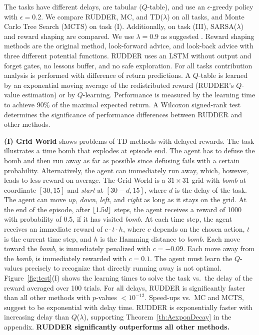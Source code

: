 \documentclass{article}
\DeclarePairedDelimiter\floor{\lfloor}{\rfloor}
\begin{document}
The tasks have different delays, 
are tabular ($Q$-table),
and use an $\epsilon$-greedy policy with $\epsilon = 0.2$.
We compare RUDDER, MC, and TD($\lambda$) 
on all tasks, and Monte Carlo Tree Search (MCTS) on task (I).
Additionally, on task (III), SARSA($\lambda$) and reward shaping are compared.
We use $\lambda=0.9$ as suggested \cite{Sutton:18book}.
Reward shaping methods are the original method, look-forward advice,
and look-back advice with three different potential functions.
RUDDER uses an LSTM without output and forget gates,
no lessons buffer, and no safe exploration. 
For all tasks contribution analysis is performed 
with difference of return predictions.  
A $Q$-table is learned 
by an exponential moving average of 
the redistributed reward (RUDDER's $Q$-value estimation) 
or by $Q$-learning. 
Performance is measured by 
the learning time to achieve 90\% of the maximal expected return.
A Wilcoxon signed-rank test determines 
the significance of performance differences between RUDDER
and other methods.



{\bf(I) Grid World} 
shows problems of TD methods with delayed rewards.
The task illustrates a time bomb that
explodes at episode end.
The agent has to defuse the bomb
and then run away as far as possible since
defusing fails with a certain probability.
Alternatively, the agent can immediately run away, 
which, however, leads to less reward on average.
The Grid World is a $31\times 31$ grid with
{\em bomb} at coordinate $[30,15]$ and
{\em start} at $[30-d, 15]$, where $d$ is the delay of the task.
The agent can move 
{\em up}, {\em down}, {\em left}, and {\em right} as long as
it stays on the grid.
At the end of the episode, after $\floor*{1.5 d}$ steps, 
the agent receives a reward of 1000
with probability of 0.5, 
if it has visited {\em bomb}.
At each time step, the agent receives 
an immediate reward of $c\cdot t \cdot h$, 
where $c$ depends on the chosen action, 
$t$ is the current time step, and $h$ is 
the Hamming distance to {\em bomb}.
Each move toward the {\em bomb}, 
is immediately penalized with $c=-0.09$. 
Each move away from the {\em bomb}, 
is immediately rewarded with $c=0.1$. 
The agent must learn the $Q$-values precisely to
recognize that directly running away is not optimal.
Figure~\ref{fig:test}(I) shows the 
learning times 
to solve the task vs.\ the delay of the reward averaged over 100 trials.
For all delays, RUDDER is significantly faster than all other methods
with $p$-values $<10^{-12}$.
Speed-ups vs.\ MC and MCTS,
suggest to be exponential with delay time.
RUDDER is exponentially faster with increasing 
delay than $Q$($\lambda$), 
supporting Theorem~\ref{th:AexponDecay} in the appendix. 
{\bf RUDDER significantly outperforms all other methods.}
\end{document}
